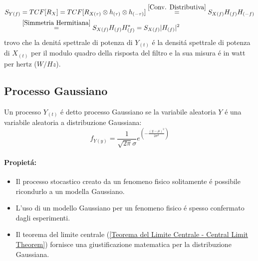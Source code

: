             \begin{align}
                S_{Y(f)} &= TCF[R_X] =TCF[ R_{X(\tau)}\otimes h_{(\tau)} \otimes h_{(-\tau)}] \overset{\ref{Conv. Distributiva}}{=}  S_{X(f)}H_{(f)} H_{(-f)}    \nonumber \\
                         &\overset{\ref{Simmetria Hermitiana}}{=} S_{X(f)}H_{(f)} H^\ast_{(f)} =  S_{X(f)}|H_{(f)}|^2\nonumber
            \end{align}
            trovo che la denitá spettrale di potenza di $Y_{(t)}$ é la densitá spettrale di potenza di $X_{(t)}$ per il modulo quadro della
            risposta del filtro e la sua misura é in watt per hertz ($W/Hz$).
    \subsection{Processo Gaussiano}
        Un processo $Y_{(t)}$ é detto processo Gaussiano se la variabile aleatoria $Y$ é una variabile aleatoria a distribuzione Gaussiana:
        \[
            f_{Y(y)} = \frac{1}{\sqrt{2\pi}\sigma}e^{\left(\displaystyle-\frac{(y-\mu)^2}{2\sigma^2}\right)}    
        \] 
        \paragraph{Propietá:}
        \begin{itemize}
            \item {
                Il processo stocastico creato da un fenomeno fisico solitamente é possibile ricondurlo a un modella Gaussiano.
            }
            \item {
                L'uso di un modello Gaussiano per un fenomeno fisico é spesso confermato dagli esperimenti.
            }
            \item {
                Il teorema del limite centrale (\ref{Teorema del Limite Centrale - Central Limit Theorem}) fornisce una giustificazione matematica per la 
                distribuzione Gaussiana.
            }
        \end{itemize}
